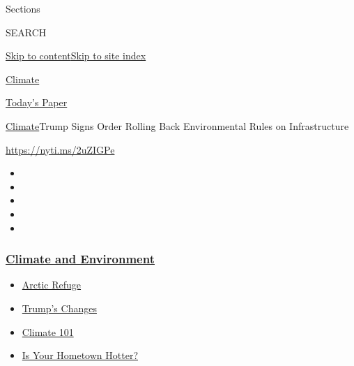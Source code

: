 Sections

SEARCH

\protect\hyperlink{site-content}{Skip to
content}\protect\hyperlink{site-index}{Skip to site index}

\href{https://www.nytimes3xbfgragh.onion/section/climate}{Climate}

\href{https://myaccount.nytimes3xbfgragh.onion/auth/login?response_type=cookie\&client_id=vi}{}

\href{https://www.nytimes3xbfgragh.onion/section/todayspaper}{Today's
Paper}

\href{/section/climate}{Climate}\textbar{}Trump Signs Order Rolling Back
Environmental Rules on Infrastructure

\url{https://nyti.ms/2uZIGPe}

\begin{itemize}
\item
\item
\item
\item
\item
\end{itemize}

\hypertarget{climate-and-environment}{%
\subsubsection{\texorpdfstring{\href{https://www.nytimes3xbfgragh.onion/section/climate?name=styln-climate\&region=TOP_BANNER\&variant=undefined\&block=storyline_menu_recirc\&action=click\&pgtype=Article\&impression_id=d385cc40-e388-11ea-b524-5975769cbb40}{Climate
and
Environment}}{Climate and Environment}}\label{climate-and-environment}}

\begin{itemize}
\tightlist
\item
  \href{https://www.nytimes3xbfgragh.onion/2020/08/17/climate/alaska-oil-drilling-anwr.html?name=styln-climate\&region=TOP_BANNER\&variant=undefined\&block=storyline_menu_recirc\&action=click\&pgtype=Article\&impression_id=d385f350-e388-11ea-b524-5975769cbb40}{Arctic
  Refuge}
\item
  \href{https://www.nytimes3xbfgragh.onion/interactive/2020/climate/trump-environment-rollbacks.html?name=styln-climate\&region=TOP_BANNER\&variant=undefined\&block=storyline_menu_recirc\&action=click\&pgtype=Article\&impression_id=d38de290-e388-11ea-b524-5975769cbb40}{Trump's
  Changes}
\item
  \href{https://www.nytimes3xbfgragh.onion/interactive/2020/04/19/climate/climate-crash-course-1.html?name=styln-climate\&region=TOP_BANNER\&variant=undefined\&block=storyline_menu_recirc\&action=click\&pgtype=Article\&impression_id=d38de291-e388-11ea-b524-5975769cbb40}{Climate
  101}
\item
  \href{https://www.nytimes3xbfgragh.onion/interactive/2018/08/30/climate/how-much-hotter-is-your-hometown.html?name=styln-climate\&region=TOP_BANNER\&variant=undefined\&block=storyline_menu_recirc\&action=click\&pgtype=Article\&impression_id=d38e09a0-e388-11ea-b524-5975769cbb40}{Is
  Your Hometown Hotter?}
\end{itemize}

